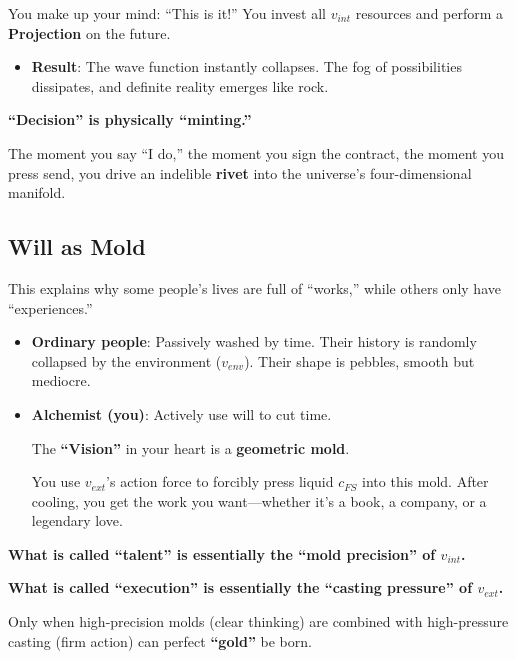 You make up your mind: ``This is it!'' You invest all $v_{int}$ resources and perform a \textbf{Projection} on the future.

\begin{itemize}
\item \textbf{Result}: The wave function instantly collapses. The fog of possibilities dissipates, and definite reality emerges like rock.
\end{itemize}

\textbf{``Decision'' is physically ``minting.''}

The moment you say ``I do,'' the moment you sign the contract, the moment you press send, you drive an indelible \textbf{rivet} into the universe's four-dimensional manifold.

\subsection{Will as Mold}

This explains why some people's lives are full of ``works,'' while others only have ``experiences.''

\begin{itemize}
\item \textbf{Ordinary people}: Passively washed by time. Their history is randomly collapsed by the environment ($v_{env}$). Their shape is pebbles, smooth but mediocre.

\item \textbf{Alchemist (you)}: Actively use will to cut time.

    The \textbf{``Vision''} in your heart is a \textbf{geometric mold}.

    You use $v_{ext}$'s action force to forcibly press liquid $c_{FS}$ into this mold. After cooling, you get the work you want---whether it's a book, a company, or a legendary love.
\end{itemize}

\textbf{What is called ``talent'' is essentially the ``mold precision'' of $v_{int}$.}

\textbf{What is called ``execution'' is essentially the ``casting pressure'' of $v_{ext}$.}

Only when high-precision molds (clear thinking) are combined with high-pressure casting (firm action) can perfect \textbf{``gold''} be born.

